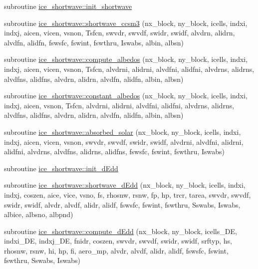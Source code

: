 \begin{DoxyCompactItemize}
\item 
subroutine \hyperlink{namespaceice__shortwave_a7fcf82fc93a6d2834b14022890d38a39}{ice\_\-shortwave::init\_\-shortwave}
\item 
subroutine \hyperlink{namespaceice__shortwave_ac077c2ab2eaf6ffb2c973427e9a9b2d0}{ice\_\-shortwave::shortwave\_\-ccsm3} (nx\_\-block, ny\_\-block, icells, indxi, indxj, aicen, vicen, vsnon, Tsfcn, swvdr, swvdf, swidr, swidf, alvdrn, alidrn, alvdfn, alidfn, fswsfc, fswint, fswthru, Iswabs, albin, albsn)
\item 
subroutine \hyperlink{namespaceice__shortwave_acd85d1094cb6791a6745cc10dfcebc31}{ice\_\-shortwave::compute\_\-albedos} (nx\_\-block, ny\_\-block, icells, indxi, indxj, aicen, vicen, vsnon, Tsfcn, alvdrni, alidrni, alvdfni, alidfni, alvdrns, alidrns, alvdfns, alidfns, alvdrn, alidrn, alvdfn, alidfn, albin, albsn)
\item 
subroutine \hyperlink{namespaceice__shortwave_a09ea7e76b2fb504e04e9b85aa63f2ac8}{ice\_\-shortwave::constant\_\-albedos} (nx\_\-block, ny\_\-block, icells, indxi, indxj, aicen, vsnon, Tsfcn, alvdrni, alidrni, alvdfni, alidfni, alvdrns, alidrns, alvdfns, alidfns, alvdrn, alidrn, alvdfn, alidfn, albin, albsn)
\item 
subroutine \hyperlink{namespaceice__shortwave_a8e3aa5ad4b562f1a00ecb4c6e024f1b1}{ice\_\-shortwave::absorbed\_\-solar} (nx\_\-block, ny\_\-block, icells, indxi, indxj, aicen, vicen, vsnon, swvdr, swvdf, swidr, swidf, alvdrni, alvdfni, alidrni, alidfni, alvdrns, alvdfns, alidrns, alidfns, fswsfc, fswint, fswthru, Iswabs)
\item 
subroutine \hyperlink{namespaceice__shortwave_ad9abb419b6673b90f9885b9f70a715ac}{ice\_\-shortwave::init\_\-dEdd}
\item 
subroutine \hyperlink{namespaceice__shortwave_a628868bc140ea7881708332dd8ef24d4}{ice\_\-shortwave::shortwave\_\-dEdd} (nx\_\-block, ny\_\-block, icells, indxi, indxj, coszen, aice, vice, vsno, fs, rhosnw, rsnw, fp, hp, trcr, tarea, swvdr, swvdf, swidr, swidf, alvdr, alvdf, alidr, alidf, fswsfc, fswint, fswthru, Sswabs, Iswabs, albice, albsno, albpnd)
\item 
subroutine \hyperlink{namespaceice__shortwave_ab654ccf63c1d24f5ce7b878325222232}{ice\_\-shortwave::compute\_\-dEdd} (nx\_\-block, ny\_\-block, icells\_\-DE, indxi\_\-DE, indxj\_\-DE, fnidr, coszen, swvdr, swvdf, swidr, swidf, srftyp, hs, rhosnw, rsnw, hi, hp, fi, aero\_\-mp, alvdr, alvdf, alidr, alidf, fswsfc, fswint, fswthru, Sswabs, Iswabs)

\end{DoxyCompactItemize}
